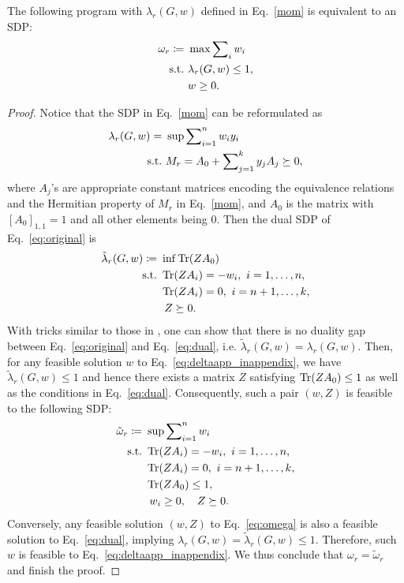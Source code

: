 \begin{theorem}
	The following program with $\lambda_r(G,w)$ defined in Eq.~\eqref{mom} is equivalent to an SDP:
\begin{align}\label{eq:deltaapp_inappendix}
	\omega_r \coloneqq\ &\max \sum\nolimits_i w_i\nonumber\\
	{\rm s.t.}\ & \lambda_r(G,w) \le 1,\nonumber\\
	     & w\ge 0.
\end{align}
\end{theorem}
\begin{proof}
Notice that the SDP in Eq.~\eqref{mom} can be reformulated as
\begin{align}\label{eq:original}
	\lambda_r(G,w) =\ &\sup \sum\nolimits_{i=1}^n w_i y_i\nonumber\\
	{\rm s.t.}\ & M_r = A_0 + \sum\nolimits_{j=1}^k y_j A_j \succeq 0,
\end{align}
where $A_j$'s are appropriate constant matrices encoding the equivalence relations and the Hermitian property of $M_r$ in Eq.~\eqref{mom}, and $A_0$ is the matrix with $[A_0]_{1,1}=1$ and all other elements being $0$. 
Then the dual SDP of Eq.~\eqref{eq:original} is
\begin{align}\label{eq:dual}
	\tilde{\lambda}_r(G,w)	\coloneqq\ &\inf \operatorname{Tr}(Z A_0)\nonumber\\
	{\rm s.t.}\ & \operatorname{Tr}(ZA_i) = -w_i, \ i=1, \ldots, n, \nonumber\\
		    & \operatorname{Tr}(ZA_i) = 0, \ i=n+1, \ldots, k,\nonumber\\
            &\ Z\succeq0.
\end{align}
With tricks similar to those in \cite{josz2016strong}, one can show that there is no duality gap between Eq.~\eqref{eq:original} and Eq.~\eqref{eq:dual}, i.e. $\tilde{\lambda}_r(G,w) = \lambda_r(G,w)$. Then, for any feasible solution $w$ to Eq.~\eqref{eq:deltaapp_inappendix}, we have $\tilde{\lambda}_r(G,w)\le1$ and hence there exists a matrix $Z$ satisfying $\operatorname{Tr}(ZA_0) \le 1$ as well as the conditions in Eq.~\eqref{eq:dual}.
Consequently, such a pair $(w,Z)$ is feasible to the following SDP:
\begin{align}\label{eq:omega}
	\tilde{\omega}_r\coloneqq\ &\sup \sum\nolimits_{i=1}^n w_i\nonumber\\
	{\rm s.t.}\ &\operatorname{Tr}(ZA_i) = -w_i,\ i=1,\ldots,n,\nonumber\\
		    &\operatorname{Tr}(ZA_i) = 0,\ i=n+1,\ldots,k,\nonumber\\
		    &\operatorname{Tr}(ZA_0) \le 1,\nonumber\\
		    &\ w_i \ge 0,\quad Z\succeq0.
\end{align}
Conversely, any feasible solution $(w,Z)$ to Eq.~\eqref{eq:omega} is also a feasible solution to Eq.~\eqref{eq:dual}, implying $\lambda_r(G,w) =\tilde{\lambda}_r(G,w)  \le 1$. Therefore, such $w$ is feasible to Eq.~\eqref{eq:deltaapp_inappendix}. We thus conclude that $\omega_r = \tilde{\omega}_r$ and finish the proof.
\end{proof}
